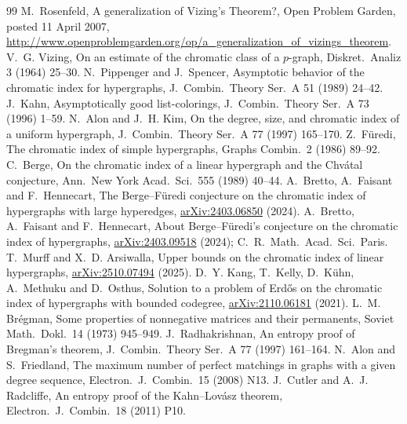 \documentclass[11pt,a4paper]{article}
\theoremstyle{plain}
\theoremstyle{definition}
\theoremstyle{remark}
\begin{document}
\begin{thebibliography}{99}
\small
\setlength{\itemsep}{2pt}
 M.~Rosenfeld, A generalization of Vizing's Theorem?, Open Problem Garden, posted 11 April 2007, \url{http://www.openproblemgarden.org/op/a_generalization_of_vizings_theorem}.
 V.~G. Vizing, On an estimate of the chromatic class of a $p$-graph, Diskret.\ Analiz 3 (1964) 25--30.
 N.~Pippenger and J.~Spencer, Asymptotic behavior of the chromatic index for hypergraphs, J.~Combin.\ Theory Ser.~A 51 (1989) 24--42.
 J.~Kahn, Asymptotically good list-colorings, J.~Combin.\ Theory Ser.~A 73 (1996) 1--59.
 N.~Alon and J.~H. Kim, On the degree, size, and chromatic index of a uniform hypergraph, J.~Combin.\ Theory Ser.~A 77 (1997) 165--170.
 Z.~F\"uredi, The chromatic index of simple hypergraphs, Graphs Combin.\ 2 (1986) 89--92.
 C.~Berge, On the chromatic index of a linear hypergraph and the Chv\'atal conjecture, Ann.\ New York Acad.\ Sci.\ 555 (1989) 40--44.
 A.~Bretto, A.~Faisant and F.~Hennecart, The Berge--F\"uredi conjecture on the chromatic index of hypergraphs with large hyperedges, \href{https://arxiv.org/abs/2403.06850}{arXiv:2403.06850} (2024).
 A.~Bretto, A.~Faisant and F.~Hennecart, About Berge--F\"uredi's conjecture on the chromatic index of hypergraphs, \href{https://arxiv.org/abs/2403.09518}{arXiv:2403.09518} (2024); C.~R.\ Math.\ Acad.\ Sci.\ Paris.
 T.~Murff and X.~D. Arsiwalla, Upper bounds on the chromatic index of linear hypergraphs, \href{https://arxiv.org/abs/2510.07494}{arXiv:2510.07494} (2025).
 D.~Y. Kang, T.~Kelly, D.~K\"uhn, A.~Methuku and D.~Osthus, Solution to a problem of Erd\H{o}s on the chromatic index of hypergraphs with bounded codegree, \href{https://arxiv.org/abs/2110.06181}{arXiv:2110.06181} (2021).
 L.~M. Br\'egman, Some properties of nonnegative matrices and their permanents, Soviet Math.\ Dokl.\ 14 (1973) 945--949.
 J.~Radhakrishnan, An entropy proof of Bregman's theorem, J.~Combin.\ Theory Ser.~A 77 (1997) 161--164.
 N.~Alon and S.~Friedland, The maximum number of perfect matchings in graphs with a given degree sequence, Electron.\ J.\ Combin.\ 15 (2008) N13.
 J.~Cutler and A.~J. Radcliffe, An entropy proof of the Kahn--Lov\'asz theorem, Electron.\ J.\ Combin.\ 18 (2011) P10.
\end{thebibliography}
\end{document}
